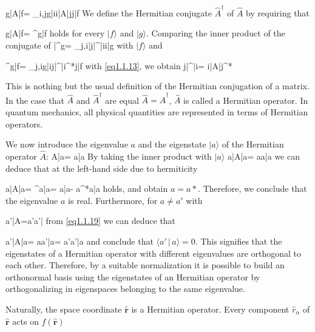 \be
\langle g|\hat A|f\rangle = \sum_{i,j}\langle g|i\rangle\langle i|\hat A|j\rangle\langle j|f\rangle
\ee
We define the Hermitian conjugate $\hat{A}^\dagger$ of $\hat A$ by requiring that

\be\label{eq1.1.13}
\langle g|\hat A|f\rangle = \langle{}^\dagger g|f\rangle
\ee
holds for every $|f\rangle$ and $|g\rangle$. Comparing the inner product of the conjugate of 
\be
|^\dagger g\rangle = \sum_{j,i}|j\rangle\langle|^\dagger|i\rangle\langle i|g\rangle
\ee
with $|f\rangle$ and

\be
\langle{}^\dagger g|f\rangle = \sum_{j,i}\langle g|i\rangle\langle j|^\dagger|i\rangle^*\langle j|f\rangle
\ee
with \eqref{eq1.1.13}, we obtain
\be
\langle j|^\dagger|i\rangle = \langle i|\hat A|j\rangle^*
\ee

This is nothing but the usual definition of the Hermitian conjugation of a matrix. In the case that $\hat A$ and $\hat{A}^\dagger$ are equal $\hat A = \hat{A}^\dagger$, $\hat A$ is called a Hermitian operator. In quantum mechanics, all physical quantities are represented in terms of Hermitian operators. 

We now introduce the eigenvalue $a$ and the eigenstate $|a\rangle$ of the Hermitian operator $\hat A$:
\be
\hat A|a\rangle = a|a\rangle
\ee
By taking the inner product with $|a\rangle$
\be
\langle a|\hat A|a\rangle = a\langle a|a\rangle
\ee
we can deduce that at the left-hand side due to hermiticity 

\be\label{eq1.1.19}
\langle a|\hat A|a\rangle = \langle {}^\dagger a|a\rangle = \langle{}a|a\rangle - a^*\langle a|a\rangle
\ee
holds, and obtain $a=a*$. Therefore, we conclude that the eigenvalue $a$ is real. Furthermore, for $a\neq a'$ with

\be
\langle a'|\hat A=a'\langle a'|
\ee
from \eqref{eq1.1.19} we can deduce that

\be
\langle a'|\hat A|a\rangle = a\langle a'|a\rangle = a'\langle a'|a\rangle
\ee
and conclude that $\langle a'\, |\, a\rangle = 0$. This signifies that the eigenstates of a Hermitian operator with different eigenvalues are orthogonal to each other. Therefore, by a suitable normalization it is possible to build an orthonormal basis using the eigenstates of an Hermitian operator by orthogonalizing in eigenspaces belonging to the same eigenvalue. 

Naturally, the space coordinate $\hat{\bm r}$ is a Hermitian operator. Every component $\hat{r}_\alpha$ of $\hat{\bm r}$ acts on $f(\hat{\bm r})$

